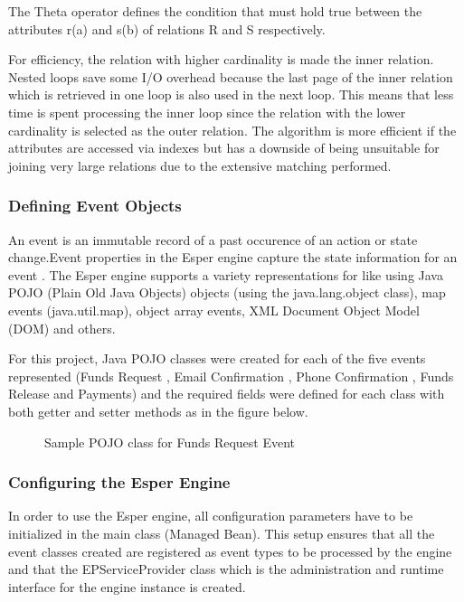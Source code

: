 \noindent The Theta operator defines the condition that must hold true between the attributes r(a) and s(b) of relations R and S respectively.

\noindent For efficiency, the relation with higher cardinality is made the inner relation. Nested loops save some I/O overhead because the last page of the inner relation which is retrieved in one loop is also used in the next loop. This means that less time is spent processing the inner loop since the relation with the lower cardinality is selected as the outer relation. The algorithm is more efficient if the attributes are accessed via indexes but has a downside of being unsuitable for joining very large relations due to the extensive matching performed.


\subsubsection{Defining Event Objects}

\noindent An event is an immutable record of a past occurence of an action or state change.Event properties  in the Esper engine capture the state information for an event \cite{twentyfive}.
The Esper engine supports a variety representations for like using Java POJO (Plain Old Java Objects) objects (using the java.lang.object class), map events (java.util.map), object array events, XML  Document Object Model (DOM) and others.

\noindent For this project, Java POJO classes were created for each of the  five events represented (Funds Request , Email Confirmation , Phone Confirmation , Funds Release and Payments) and the required fields were defined for each class with both getter and setter methods as in the figure below.

\begin{center}
\begin{figure}[h]
\caption{Sample POJO class for Funds Request Event}

\end{figure}
\end{center}

\subsubsection{Configuring the Esper Engine}

\noindent In order to use the Esper engine, all configuration parameters have to be initialized in the main class (Managed Bean). This setup ensures that all the event classes created are registered as event types to be processed by the engine and that the EPServiceProvider class which is the administration and runtime interface for the engine instance is created.

